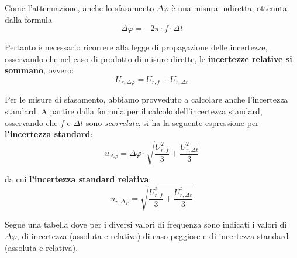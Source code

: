 Come l'attenuazione, anche lo sfasamento $\Delta \varphi$ è una misura indiretta, ottenuta dalla formula
\[\Delta \varphi =  -2\pi \cdot f \cdot \Delta t  \]

Pertanto è necessario ricorrere alla legge di propagazione delle incertezze, osservando che nel caso di prodotto di misure dirette, le \textbf{incertezze relative si sommano}, ovvero:
\[U_{r,\Delta \varphi} = U_{r,f} + U_{r,\Delta t}\]

Per le misure di sfasamento, abbiamo provveduto a calcolare anche l'incertezza standard. A partire dalla formula per il calcolo dell'incertezza standard, osservando che $f$ e $\Delta t$ sono \emph{scorrelate}, si ha la seguente espressione per \textbf{l'incertezza standard}:
\[u_{\Delta \varphi} = \Delta\varphi \cdot \sqrt{\frac{U_{r,f}^2}{3}+ \frac{U_{r,\Delta t}^2}{3}}\]

da cui\textbf{ l'incertezza standard relativa}:
\[u_{r,\Delta \varphi} = \sqrt{\frac{U_{r,f}^2}{3}+ \frac{U_{r,\Delta t}^2}{3}}\]

Segue una tabella dove per i diversi valori di frequenza sono indicati i valori di $\Delta\varphi$, di incertezza (assoluta e relativa) di caso peggiore e di incertezza standard (assoluta e relativa).

